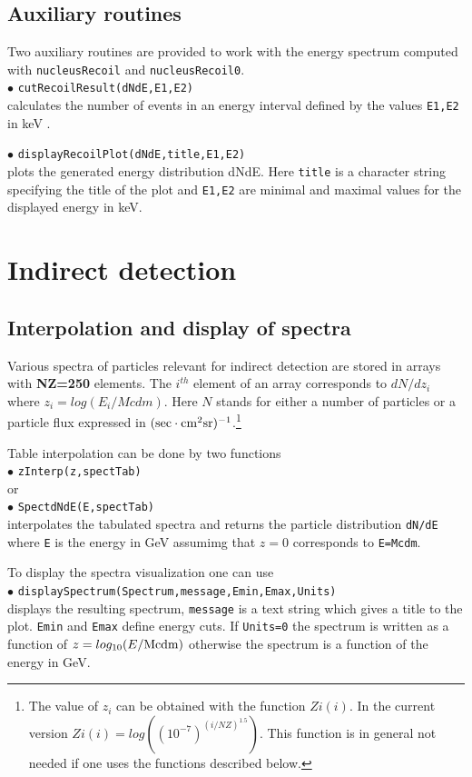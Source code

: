 \documentclass[12pt,a4paper]{article}
\begin{document}
\subsection{Auxiliary routines}
Two auxiliary routines are provided to work with the energy
spectrum computed with
\verb|nucleusRecoil| and  \verb|nucleusRecoil0|.\\
%
\noindent
$\bullet$ \verb|cutRecoilResult(dNdE,E1,E2)|\\
calculates the number of events in an energy interval defined by the
values \verb|E1,E2| in keV .

\noindent
$\bullet$ \verb|displayRecoilPlot(dNdE,title,E1,E2)|\\
plots the  generated energy distribution dNdE. Here \verb|title|
is a character string specifying the title of the plot and
\verb|E1,E2| are minimal and maximal values for the displayed
energy in keV.

\section{Indirect detection}

\subsection{ Interpolation and display of spectra}
Various spectra of particles relevant for indirect detection are stored in
arrays with {\bf NZ=250} elements. The $i^{th}$ element of an array corresponds to 
 $dN/dz_i$ where $z_i=log(E_i/Mcdm)$. Here $N$ stands for either 
 a number of particles or  a particle flux expressed in $(\rm{sec}\cdot{\rm cm}^2 {\rm
sr})^{-1}$.\footnote{
The value of $z_i$ can be obtained with the function 
$Zi(i)$. In the current version
$Zi(i)=log\left((10^{-7})^{(i/NZ)^{1.5}}\right)$. This function is in general not needed if one uses
the functions  described below.}

Table interpolation can be done by two functions\\ 
$\bullet$ \verb|zInterp(z,spectTab)| \\
or\\
$\bullet$  \verb|SpectdNdE(E,spectTab)|\\
interpolates the tabulated spectra  and returns the 
particle distribution \verb|dN/dE|  where \verb|E| is the energy  in GeV assumimg that 
$z=0$ corresponds to   \verb|E=Mcdm|.

To display the  spectra visualization one can use \\
$\bullet$ \verb|displaySpectrum(Spectrum,message,Emin,Emax,Units)|\\
displays the resulting spectrum, \verb|message| is a text string which gives a title to the  
plot. \verb|Emin| and \verb|Emax| define  energy cuts. If \verb|Units=0| the spectrum is written as a
function of $z=log_{10}(E/{\rm {Mcdm}})$ otherwise the spectrum is a function of the energy in GeV.
\end{document}
